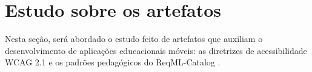 








\section{Estudo sobre os artefatos}
Nesta seção, será abordado o estudo feito de artefatos que auxiliam o desenvolvimento de aplicações educacionais móveis: as diretrizes de acessibilidade WCAG 2.1 e os padrões pedagógicos do ReqML-Catalog \citep{soad2017reqml}.


